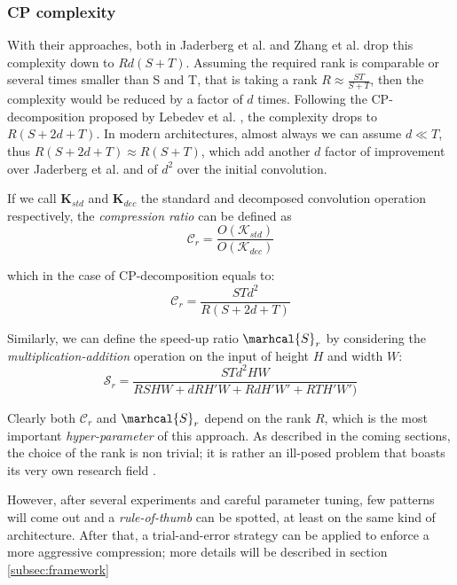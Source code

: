\subsubsection{CP complexity}

With their approaches, both in Jaderberg et al.\parencite{jaderberg2014} and Zhang et al. \parencite{zhang2015SVD} drop this complexity down to $Rd(S+T)$. Assuming the required rank is comparable or several times smaller than S and T, that is taking a rank $R\approx \frac{ST}{S+T}$, then the complexity would be reduced by a factor of $d$ times. 
\newline 
Following the CP-decomposition proposed by Lebedev et al. \parencite{lebedev}, the complexity drops to $R(S+2d+T)$. In modern architectures, almost always we can assume $d\ll T$, thus $R(S+2d+T) \approx R(S+T)$,  which add another $d$ factor of improvement over Jaderberg et al. and of $d^2$ over the initial convolution. 


If we call $\mathbf{K}_{std}$ and $\mathbf{K}_{dec}$ the standard and decomposed convolution operation respectively,  the \emph{compression ratio} can be defined as
\begin{equation}
    \mathbf{\mathcal{C}}_r = \frac{O(\mathcal{K}_{std})}{O(\mathcal{K}_{dec})}
\end{equation}

which in the case of CP-decomposition equals to: 
\begin{equation}
    \mathcal{C}_r = \frac{STd^2}{R(S+2d+T)}    
\end{equation}

Similarly, we can define the speed-up ratio $\marhcal{S}_r$ by considering the \emph{multiplication-addition} operation on the input of height $H$ and width $W$: 
\begin{equation}
    \mathcal{S}_r = \frac{STd^2HW}{RSHW + dRH'W + RdH'W'+ RTH'W')}    
\end{equation}


Clearly both $\mathcal{C}_r$ and $\marhcal{S}_r$ depend on the rank $R$, which is the most important \emph{hyper-parameter} of this approach. As described in the coming sections, the choice of the rank is non trivial; it is rather an ill-posed problem that boasts its very own research field \parencite{rank-hard1}. 

However, after several experiments and careful parameter tuning, few patterns will come out and a \emph{rule-of-thumb} can be spotted, at least on the same kind of architecture. After that, a trial-and-error strategy can be applied to enforce a more aggressive compression; more details will be described in section \ref{subsec:framework}

